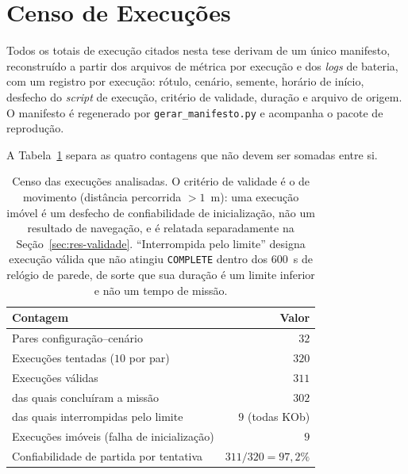 \section{Censo de Execuções}
\label{sec:setup-censo}

Todos os totais de execução citados nesta tese derivam de um único manifesto,
reconstruído a partir dos arquivos de métrica por execução e dos \textit{logs} de
bateria, com um registro por execução: rótulo, cenário, semente, horário de início,
desfecho do \textit{script} de execução, critério de validade, duração e arquivo de
origem. O manifesto é regenerado por \texttt{gerar\_manifesto.py} e acompanha o pacote
de reprodução.

A Tabela~\ref{tab:setup-censo} separa as quatro contagens que não devem ser somadas
entre si.

\begin{table}[htb]
\centering
\caption{Censo das execuções analisadas. O critério de validade é o de movimento
(distância percorrida $>1$~m): uma execução imóvel é um desfecho de confiabilidade de
inicialização, não um resultado de navegação, e é relatada separadamente na
Seção~\ref{sec:res-validade}. ``Interrompida pelo limite'' designa execução válida que
não atingiu \texttt{COMPLETE} dentro dos $600$~s de relógio de parede, de sorte que sua
duração é um limite inferior e não um tempo de missão.}
\label{tab:setup-censo}
\footnotesize
\begin{tabular}{lr}
\hline
\textbf{Contagem} & \textbf{Valor}\\
\hline
Pares configuração--cenário                     & $32$\\
Execuções tentadas ($10$ por par)               & $320$\\
Execuções válidas                               & $311$\\
\quad das quais concluíram a missão             & $302$\\
\quad das quais interrompidas pelo limite       & $9$ (todas KOb)\\
Execuções imóveis (falha de inicialização)      & $9$\\
Confiabilidade de partida por tentativa         & $311/320 = 97{,}2\%$\\
\hline
\end{tabular}
\end{table}

